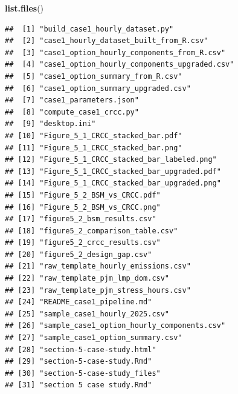 \documentclass[
]{article}
\newenvironment{Shaded}{\begin{snugshade}}{\end{snugshade}}
\newcommand{\FunctionTok}[1]{\textcolor[rgb]{0.13,0.29,0.53}{\textbf{#1}}}
\newcommand{\NormalTok}[1]{#1}
\begin{document}
\begin{Shaded}
\begin{Highlighting}[]
\FunctionTok{list.files}\NormalTok{()}
\end{Highlighting}
\end{Shaded}

\begin{verbatim}
##  [1] "build_case1_hourly_dataset.py"              
##  [2] "case1_hourly_dataset_built_from_R.csv"      
##  [3] "case1_option_hourly_components_from_R.csv"  
##  [4] "case1_option_hourly_components_upgraded.csv"
##  [5] "case1_option_summary_from_R.csv"            
##  [6] "case1_option_summary_upgraded.csv"          
##  [7] "case1_parameters.json"                      
##  [8] "compute_case1_crcc.py"                      
##  [9] "desktop.ini"                                
## [10] "Figure_5_1_CRCC_stacked_bar.pdf"            
## [11] "Figure_5_1_CRCC_stacked_bar.png"            
## [12] "Figure_5_1_CRCC_stacked_bar_labeled.png"    
## [13] "Figure_5_1_CRCC_stacked_bar_upgraded.pdf"   
## [14] "Figure_5_1_CRCC_stacked_bar_upgraded.png"   
## [15] "Figure_5_2_BSM_vs_CRCC.pdf"                 
## [16] "Figure_5_2_BSM_vs_CRCC.png"                 
## [17] "figure5_2_bsm_results.csv"                  
## [18] "figure5_2_comparison_table.csv"             
## [19] "figure5_2_crcc_results.csv"                 
## [20] "figure5_2_design_gap.csv"                   
## [21] "raw_template_hourly_emissions.csv"          
## [22] "raw_template_pjm_lmp_dom.csv"               
## [23] "raw_template_pjm_stress_hours.csv"          
## [24] "README_case1_pipeline.md"                   
## [25] "sample_case1_hourly_2025.csv"               
## [26] "sample_case1_option_hourly_components.csv"  
## [27] "sample_case1_option_summary.csv"            
## [28] "section-5-case-study.html"                  
## [29] "section-5-case-study.Rmd"                   
## [30] "section-5-case-study_files"                 
## [31] "section 5 case study.Rmd"
\end{verbatim}
\end{document}
